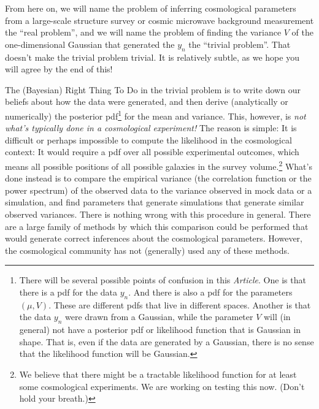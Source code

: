 \documentclass[12pt, letterpaper, preprint]{aastex}
\newcommand{\documentname}{\textsl{Article}}
\begin{document}
From here on, we will name the problem of inferring cosmological
parameters from a large-scale structure survey or cosmic microwave
background measurement the ``real problem'', and we will name the
problem of finding the variance $V$ of the one-dimensional Gaussian
that generated the $y_n$ the ``trivial problem''.
That doesn't make the trivial problem trivial.
It is relatively subtle, as we hope you will agree by the end of this!

The (Bayesian) Right Thing To Do in the trivial problem is to write
down our beliefs about how the data were generated, and then derive
(analytically or numerically) the posterior pdf\footnote{There will be
  several possible points of confusion in this \documentname. One is
  that there is a pdf for the data $y_n$. And there is also a pdf for
  the parameters $(\mu,V)$. These are different pdfs that live in
  different spaces. Another is that the data $y_n$ were drawn from a
  Gaussian, while the parameter $V$ will (in general) not have a
  posterior pdf or likelihood function that is Gaussian in shape. That
  is, even if the data are generated by a Gaussian, there is no sense
  that the likelihood function will be Gaussian.} for the mean and
variance.
This, however, is \emph{not what's typically done in a cosmological
experiment!}
The reason is simple: It is difficult or perhaps impossible to compute
the likelihood in the cosmological context: It would require a pdf
over all possible experimental outcomes, which means all possible
positions of all possible galaxies in the survey volume.\footnote{We
  believe that there might be a tractable likelihood function for at
  least some cosmological experiments. We are working on testing this
  now. (Don't hold your breath.)}
What's done instead is to compare the empirical variance (the
correlation function or the power spectrum) of the observed data to
the variance observed in mock data or a simulation, and find
parameters that generate simulations that generate similar observed
variances.
There is nothing wrong with this procedure in general.  There are a
large family of methods by which this comparison could be performed
that would generate correct inferences about the cosmological
parameters.
However, the cosmological community has not (generally) used any of
these methods.
\end{document}
